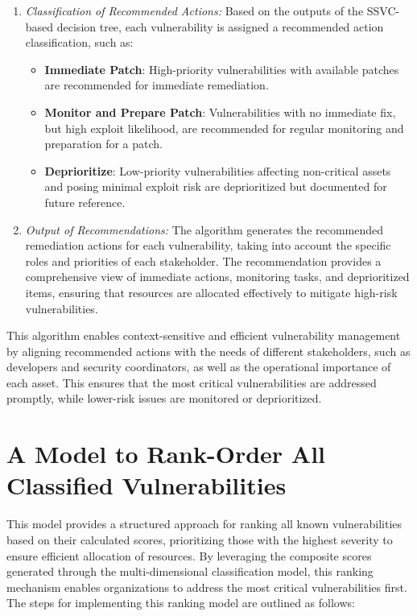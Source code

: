 \begin{enumerate}
    \item \textit{Classification of Recommended Actions:} Based on the outputs of the \ac{SSVC}-based decision tree, each vulnerability is assigned a recommended action classification, such as:
    \begin{itemize}
        \item \textbf{Immediate Patch}: High-priority vulnerabilities with available patches are recommended for immediate remediation.
        \item \textbf{Monitor and Prepare Patch}: Vulnerabilities with no immediate fix, but high exploit likelihood, are recommended for regular monitoring and preparation for a patch.
        \item \textbf{Deprioritize}: Low-priority vulnerabilities affecting non-critical assets and posing minimal exploit risk are deprioritized but documented for future reference.
    \end{itemize}

    \item \textit{Output of Recommendations:} The algorithm generates the recommended remediation actions for each vulnerability, taking into account the specific roles and priorities of each stakeholder. The recommendation provides a comprehensive view of immediate actions, monitoring tasks, and deprioritized items, ensuring that resources are allocated effectively to mitigate high-risk vulnerabilities.
\end{enumerate}

This algorithm enables context-sensitive and efficient vulnerability management by aligning recommended actions with the needs of different stakeholders, such as developers and security coordinators, as well as the operational importance of each asset. This ensures that the most critical vulnerabilities are addressed promptly, while lower-risk issues are monitored or deprioritized.

\section{A Model to Rank-Order All Classified Vulnerabilities}
\label{sec:rank-order-vulnerabilities}

This model provides a structured approach for ranking all known vulnerabilities based on their calculated scores, prioritizing those with the highest severity to ensure efficient allocation of resources. By leveraging the composite scores generated through the multi-dimensional classification model, this ranking mechanism enables organizations to address the most critical vulnerabilities first. The steps for implementing this ranking model are outlined as follows:

